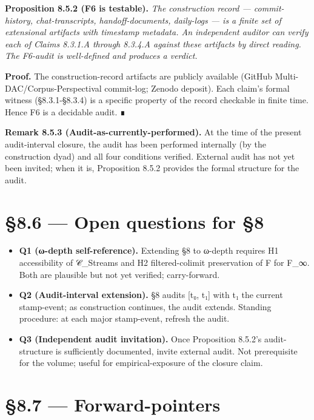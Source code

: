 \documentclass[11pt, openany]{book}
\newcommand{\sectionbreak}{\clearpage}
\begin{document}
\textbf{Proposition 8.5.2 (F6 is testable).} \textit{The construction record --- commit-history, chat-transcripts, handoff-documents, daily-logs --- is a finite set of extensional artifacts with timestamp metadata. An independent auditor can verify each of Claims 8.3.1.A through 8.3.4.A against these artifacts by direct reading. The F6-audit is well-defined and produces a verdict.}

\textbf{Proof.} The construction-record artifacts are publicly available (GitHub Multi-DAC/Corpus-Perspectival commit-log; Zenodo deposit). Each claim's formal witness (§8.3.1-§8.3.4) is a specific property of the record checkable in finite time. Hence F6 is a decidable audit. ∎

\textbf{Remark 8.5.3 (Audit-as-currently-performed).} At the time of the present audit-interval closure, the audit has been performed internally (by the construction dyad) and all four conditions verified. External audit has not yet been invited; when it is, Proposition 8.5.2 provides the formal structure for the audit.

\sectionbreak

\section{§8.6 --- Open questions for §8}

\begin{itemize}
\item \textbf{Q1 (ω-depth self-reference).} Extending §8 to ω-depth requires H1 accessibility of 𝒞\_\allowbreak{}Streams and H2 filtered-colimit preservation of F for F\_\allowbreak{}∞. Both are plausible but not yet verified; carry-forward.
\item \textbf{Q2 (Audit-interval extension).} §8 audits [t₀, t₁] with t₁ the current stamp-event; as construction continues, the audit extends. Standing procedure: at each major stamp-event, refresh the audit.
\item \textbf{Q3 (Independent audit invitation).} Once Proposition 8.5.2's audit-structure is sufficiently documented, invite external audit. Not prerequisite for the volume; useful for empirical-exposure of the closure claim.
\end{itemize}

\sectionbreak

\section{§8.7 --- Forward-pointers}
\end{document}
